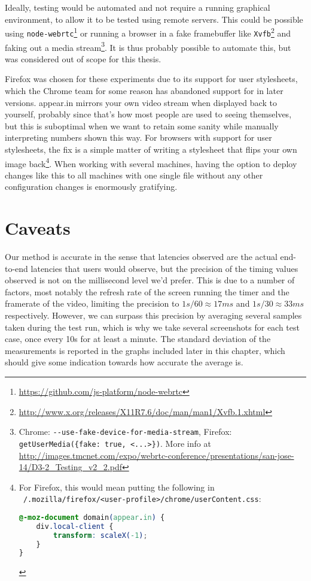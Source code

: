Ideally, testing would be automated and not require a running graphical environment, to allow it to be tested using remote servers. This could be possible using \texttt{node-webrtc}\footnote{\url{https://github.com/js-platform/node-webrtc}} or running a browser in a fake framebuffer like \texttt{Xvfb}\footnote{\url{http://www.x.org/releases/X11R7.6/doc/man/man1/Xvfb.1.xhtml}} and faking out a media stream\footnote{Chrome: \texttt{-{}-use-fake-device-for-media-stream}, Firefox: \texttt{getUserMedia(\{fake: true, <...>\})}. More info at \url{http://images.tmcnet.com/expo/webrtc-conference/presentations/san-jose-14/D3-2_Testing_v2_2.pdf}}. It is thus probably possible to automate this, but was considered out of scope for this thesis.

Firefox was chosen for these experiments due to its support for user stylesheets, which the Chrome team for some reason has abandoned support for in later versions. appear.in mirrors your own video stream when displayed back to yourself, probably since that's how most people are used to seeing themselves, but this is suboptimal when we want to retain some sanity while manually interpreting numbers shown this way. For browsers with support for user stylesheets, the fix is a simple matter of writing a stylesheet that flips your own image back\cprotect\footnote{For Firefox, this would mean putting the following in \texttt{~/.mozilla/firefox/<user-profile>/chrome/userContent.css}:
\begin{lstlisting}[language=CSS]
@-moz-document domain(appear.in) {
    div.local-client {
        transform: scaleX(-1);
    }
}
\end{lstlisting}}. When working with several machines, having the option to deploy changes like this to all machines with one single file without any other configuration changes is enormously gratifying.


\section{Caveats}

Our method is accurate in the sense that latencies observed are the actual end-to-end latencies that users would observe, but the precision of the timing values observed is not on the millisecond level we'd prefer. This is due to a number of factors, most notably the refresh rate of the screen running the timer and the framerate of the video, limiting the precision to $1s/60\approx17ms$ and $1s/30\approx33ms$ respectively. However, we can surpass this precision by averaging several samples taken during the test run, which is why we take several screenshots for each test case, once every 10s for at least a minute. The standard deviation of the measurements is reported in the graphs included later in this chapter, which should give some indication towards how accurate the average is.

